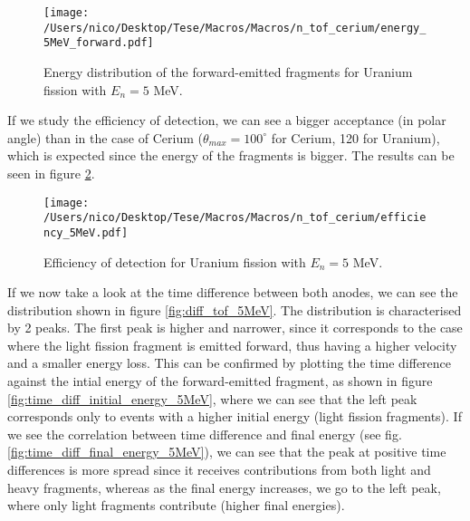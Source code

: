 \documentclass{article}
\begin{document}
\begin{figure}[H]
    \centering
    \texttt{[image: /Users/nico/Desktop/Tese/Macros/Macros/n\_tof\_cerium/energy\_5MeV\_forward.pdf]}
    \caption{Energy distribution of the forward-emitted fragments for Uranium fission with $E_n=5$ MeV.}
    \label{fig:energy_5MeV_forw}
\end{figure}
If we study the efficiency of detection, we can see a bigger acceptance (in polar angle) than in the case of Cerium ($\theta_{max}=100 ^{\circ}$ for Cerium, 120 for Uranium), which is expected since the energy of the fragments is bigger. The results can be seen in figure \ref{fig:eff_5MeV}.
\begin{figure}[H]
    \centering   
    \texttt{[image: /Users/nico/Desktop/Tese/Macros/Macros/n\_tof\_cerium/efficiency\_5MeV.pdf]}
    \caption{Efficiency of detection for Uranium fission with $E_n=5$ MeV.}
    \label{fig:eff_5MeV}
\end{figure}
If we now take a look at the time difference between both anodes, we can see the distribution shown in figure \ref{fig:diff_tof_5MeV}. The distribution is characterised by 2 peaks. The first peak is higher and narrower, since it corresponds to the case where the light fission fragment is emitted forward, thus having a higher velocity and a smaller energy loss. This can be confirmed by plotting the time difference against the intial energy of the forward-emitted fragment, as shown in figure \ref{fig:time_diff_initial_energy_5MeV}, where we can see that the left peak corresponds only to events with a higher initial energy (light fission fragments). If we see the correlation between time difference and final energy (see fig. \ref{fig:time_diff_final_energy_5MeV}), we can see that the peak at positive time differences is more spread since it receives contributions from both light and heavy fragments, whereas as the final energy increases, we go to the left peak, where only light fragments contribute (higher final energies).
\end{document}
